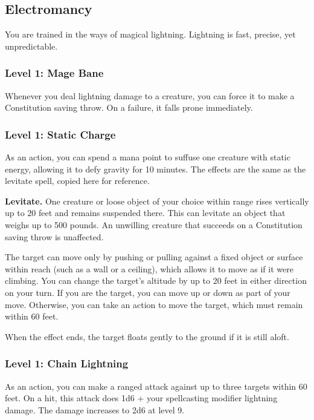 \documentclass[12pt,letterpaper,twocolumn,openany,nodeprecatedcode,bg=none]{dndbook}
\let\oldsubsection\subsection
\renewcommand{\subsection}[1]{%
  \needspace{5\baselineskip}%
  \oldsubsection{#1}%
}
\begin{document}
\clearpage

\subsection{Electromancy}\label{electromancy}

You are trained in the ways of magical lightning. Lightning is fast,
precise, yet unpredictable.

\subsubsection{Level 1: Mage Bane}\label{level-1-mage-bane}

Whenever you deal lightning damage to a creature, you can force it to
make a Constitution saving throw. On a failure, it falls prone
immediately.

\subsubsection{Level 1: Static Charge}\label{level-1-static-charge}

As an action, you can spend a mana point to suffuse one creature with
static energy, allowing it to defy gravity for 10 minutes. The effects
are the same as the levitate spell, copied here for reference.

\textbf{Levitate.} One creature or loose object of your choice within
range rises vertically up to 20 feet and remains suspended there. This
can levitate an object that weighs up to 500 pounds. An unwilling
creature that succeeds on a Constitution saving throw is unaffected.

The target can move only by pushing or pulling against a fixed object or
surface within reach (such as a wall or a ceiling), which allows it to
move as if it were climbing. You can change the target's altitude by up
to 20 feet in either direction on your turn. If you are the target, you
can move up or down as part of your move. Otherwise, you can take an
action to move the target, which must remain within 60 feet.

When the effect ends, the target floats gently to the ground if it is
still aloft.

\subsubsection{Level 1: Chain Lightning}\label{level-1-chain-lightning}

As an action, you can make a ranged attack against up to three targets
within 60 feet. On a hit, this attack does 1d6 + your spellcasting
modifier lightning damage. The damage increases to 2d6 at level 9.
\end{document}
